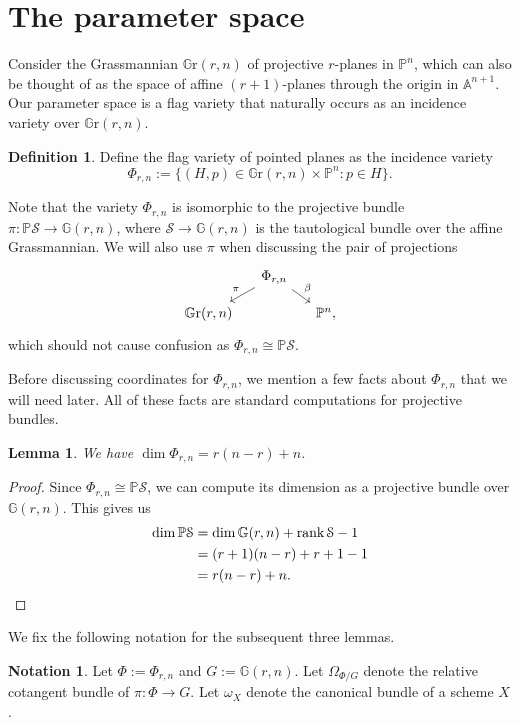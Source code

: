 \documentclass[12pt]{amsart}
\numberwithin{equation}{section}
\theoremstyle{plain}
\newtheorem{lem}[thm]{Lemma}
\theoremstyle{definition}
\newtheorem{defn}[thm]{Definition}
\newtheorem{notn}[thm]{Notation}
\newcommand{\mb}[1]{\mathbb{#1}}
\newcommand{\mc}[1]{\mathcal{#1}}
\newcommand{\PGr}{\mathbb{G}\mathrm{r}}
\newcommand{\rank}{\operatorname{rank}}
\begin{document}
\section{The parameter space}\label{sec:parameter space}
Consider the Grassmannian $\PGr(r,n)$ of projective $r$-planes in $\mb{P}^n$, which can also be thought of as the space of affine $(r+1)$-planes through the origin in $\mb{A}^{n+1}$. Our parameter space is a flag variety that naturally occurs as an incidence variety over $\PGr(r,n)$.

\begin{defn}\label{def:Phi}
    Define the flag variety of pointed planes as the incidence variety
    \[\Phi_{r,n}:=\{(H,p)\in\PGr(r,n)\times\mb{P}^n:p\in H\}.\]
\end{defn}

Note that the variety $\Phi_{r,n}$ is isomorphic to the projective bundle $\pi\colon \mb{P}\mc{S}\to\mb{G}(r,n)$, where $\mc{S}\to\mb{G}(r,n)$ is the tautological bundle over the affine Grassmannian. We will also use $\pi$ when discussing the pair of projections
\[\begin{tikzcd}[sep=small]
    & \Phi_{r,n}\arrow[dl,"\pi"']\arrow[dr,"\beta"] &\\
    \PGr(r,n) & & \mb{P}^n,
\end{tikzcd}\]
which should not cause confusion as $\Phi_{r,n}\cong\mb{P}\mc{S}$.%

Before discussing coordinates for $\Phi_{r,n}$, we mention a few facts about $\Phi_{r,n}$ that we will need later. All of these facts are standard computations for projective bundles.

\begin{lem}\label{lem:dim Phi}
    We have $\dim\Phi_{r,n}=r(n-r)+n$.
\end{lem}
\begin{proof}
    Since $\Phi_{r,n}\cong\mb{P}\mc{S}$, we can compute its dimension as a projective bundle over $\mb{G}(r,n)$. This gives us
    \begin{align*}
        \dim\mb{P}\mc{S}&=\dim\mb{G}(r,n)+\rank\mc{S}-1\\
        &=(r+1)(n-r)+r+1-1\\
        &=r(n-r)+n.\qedhere
    \end{align*}
\end{proof}

We fix the following notation for the subsequent three lemmas.

\begin{notn}
    Let $\Phi:=\Phi_{r,n}$ and $G:=\mb{G}(r,n)$. Let $\Omega_{\Phi/G}$ denote the relative cotangent bundle of $\pi\colon \Phi\to G$. Let $\omega_X$ denote the canonical bundle of a scheme $X$.
\end{notn}
\end{document}

